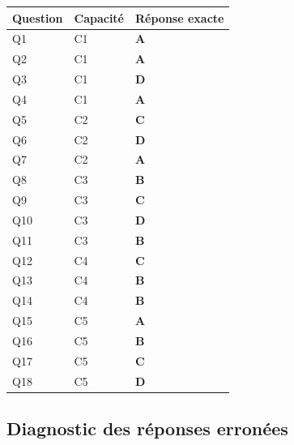 \begin{center}
\begin{tabular}{lll}
\hline
Question & Capacité & Réponse exacte \\
\hline
Q1 & C1 & \textbf{A} \\
Q2 & C1 & \textbf{A} \\
Q3 & C1 & \textbf{D} \\
Q4 & C1 & \textbf{A} \\
Q5 & C2 & \textbf{C} \\
Q6 & C2 & \textbf{D} \\
Q7 & C2 & \textbf{A} \\
Q8 & C3 & \textbf{B} \\
Q9 & C3 & \textbf{C} \\
Q10 & C3 & \textbf{D} \\
Q11 & C3 & \textbf{B} \\
Q12 & C4 & \textbf{C} \\
Q13 & C4 & \textbf{B} \\
Q14 & C4 & \textbf{B} \\
Q15 & C5 & \textbf{A} \\
Q16 & C5 & \textbf{B} \\
Q17 & C5 & \textbf{C} \\
Q18 & C5 & \textbf{D} \\
\hline
\end{tabular}
\end{center}

\subsection*{Diagnostic des réponses erronées}

